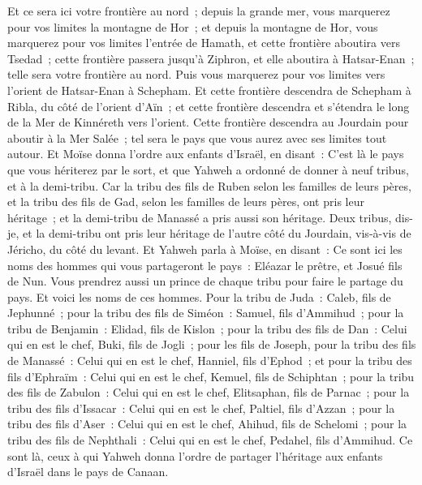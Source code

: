 \begin{multicols}{2}
Et ce sera ici votre frontière au nord~; depuis la grande mer, vous marquerez pour vos limites la montagne de Hor~;
et depuis la montagne de Hor, vous marquerez pour vos limites l'entrée de Hamath, et cette frontière aboutira vers Tsedad~;
cette frontière passera jusqu'à Ziphron, et elle aboutira à Hatsar-Enan~; telle sera votre frontière au nord.
Puis vous marquerez pour vos limites vers l'orient de Hatsar-Enan à Schepham.
Et cette frontière descendra de Schepham à Ribla, du côté de l'orient d'Aïn~; et cette frontière descendra et s'étendra le long de la Mer de Kinnéreth vers l'orient.
Cette frontière descendra au Jourdain pour aboutir à la Mer Salée~; tel sera le pays que vous aurez avec ses limites tout autour.
Et Moïse donna l'ordre aux enfants d'Israël, en disant~: C'est là le pays que vous hériterez par le sort, et que Yahweh a ordonné de donner à neuf tribus, et à la demi-tribu.
Car la tribu des fils de Ruben selon les familles de leurs pères, et la tribu des fils de Gad, selon les familles de leurs pères, ont pris leur héritage~; et la demi-tribu de Manassé a pris aussi son héritage.
Deux tribus, dis-je, et la demi-tribu ont pris leur héritage de l'autre côté du Jourdain, vis-à-vis de Jéricho, du côté du levant.
Et Yahweh parla à Moïse, en disant~:
Ce sont ici les noms des hommes qui vous partageront le pays~: Eléazar le prêtre, et Josué fils de Nun.
Vous prendrez aussi un prince de chaque tribu pour faire le partage du pays.
Et voici les noms de ces hommes. Pour la tribu de Juda~: Caleb, fils de Jephunné~;
pour la tribu des fils de Siméon~: Samuel, fils d'Ammihud~;
pour la tribu de Benjamin~: Elidad, fils de Kislon~;
pour la tribu des fils de Dan~: Celui qui en est le chef, Buki, fils de Jogli~;
pour les fils de Joseph, pour la tribu des fils de Manassé~: Celui qui en est le chef, Hanniel, fils d'Ephod~;
et pour la tribu des fils d'Ephraïm~: Celui qui en est le chef, Kemuel, fils de Schiphtan~;
pour la tribu des fils de Zabulon~: Celui qui en est le chef, Elitsaphan, fils de Parnac~;
pour la tribu des fils d'Issacar~: Celui qui en est le chef, Paltiel, fils d'Azzan~;
pour la tribu des fils d'Aser~: Celui qui en est le chef, Ahihud, fils de Schelomi~;
pour la tribu des fils de Nephthali~: Celui qui en est le chef, Pedahel, fils d'Ammihud.
Ce sont là, ceux à qui Yahweh donna l'ordre de partager l'héritage aux enfants d'Israël dans le pays de Canaan.

\end{multicols}
